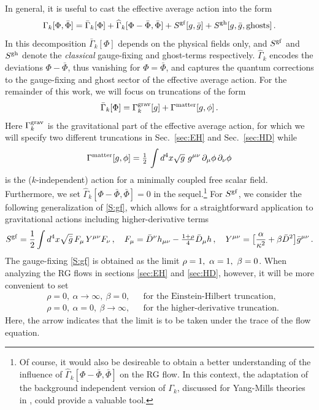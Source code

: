 \documentclass[preprint,preprintnumbers,amsmath,amssymb,nofootinbib,APS]{revtex4}
\newcommand{\be}{\begin{equation}}
\newcommand{\ee}{\end{equation}}
\newcommand{\bea}{\begin{eqnarray}}
\newcommand{\eea}{\end{eqnarray}}
\newcommand{\2}{\sqrt{2\,}}
\newcommand{\half}{\tfrac{1}{2}}
\newcommand{\gb}{\bar{g}}
\newcommand{\p}{\partial}
\newcommand{\Db}{\bar{D}}
\begin{document}
In general, it is useful to cast the effective average action into the form \cite{Reuter:1996cp}
%
\be
\Gamma_k[\Phi, \bar{\Phi}] = \bar{\Gamma}_k[\Phi] + \widehat{\Gamma}_k[\Phi - \bar{\Phi}, \bar{\Phi}] + 
S^{\rm gf}[g, \gb] + S^{\rm gh}[g, \gb, {\rm ghosts}] \, .
\ee
%
 In this decomposition $\bar{\Gamma}_k[\Phi]$ depends on the physical fields only, and $S^{\rm gf}$ and $S^{\rm gh}$ denote the {\it classical} gauge-fixing and ghost-terms respectively. $\widehat{\Gamma}_k$ encodes the deviations
$\Phi - \bar{\Phi}$, thus vanishing for $\Phi = \bar{\Phi}$, and captures the quantum corrections to the gauge-fixing and ghost sector of the effective average action.
For the remainder of this work, we will focus on truncations of the form
%
\be\label{EAA}
\bar{\Gamma}_k[\Phi] = \Gamma_k^{\rm grav}[g] + \Gamma^{\rm matter}[g, \phi] \, .
\ee
%
Here $\Gamma_k^{\rm grav}$ is the gravitational part of the effective average action, for which we will specify two different truncations in Sec.~\ref{sec:EH} and Sec.~\ref{sec:HD} while
%
\be\label{matter}
\Gamma^{\rm matter}[g, \phi] = \half \, \int d^4x \sqrt{g} \,  \, g^{\mu\nu} \, \p_\mu \phi \, \p_\nu \phi
\ee
%
is the ($k$-independent) action for a minimally coupled free scalar field. Furthermore, we set $\widehat{\Gamma}_k[\Phi-\bar{\Phi}, \bar{\Phi}] = 0$ in the sequel.\footnote{Of course, it would also be desireable to obtain a better understanding of the influence of $\widehat{\Gamma}_k[\Phi-\bar{\Phi}, \bar{\Phi}]$ on the RG flow. 
 In this context, the adaptation of the background independent version of $\Gamma_k$, discussed for Yang-Mills theories in \cite{Litim:2002ce}, could provide a valuable tool.} For $S^{\rm gf}$, we consider the following generalization of \eqref{S:gf}, 
which allows for a straightforward application to gravitational actions including higher-derivative terms
%
\be\label{S:gf2}
S^{\rm gf} = \frac{1}{2} \int d^4 x \sqrt{\gb} \, F_\mu \, Y^{\mu\nu} F_\nu \, , \quad
F_\mu = \Db^\nu h_{\mu \nu} - \tfrac{1+\rho}{4} \Db_\mu h \, , \quad Y^{\mu \nu} = \big[ \frac{\alpha}{\kappa^2} + \beta \Db^2 \big] \gb^{\mu \nu} \, .
\ee
%
The gauge-fixing \eqref{S:gf} is obtained as the limit $\rho = 1,\ \alpha = 1,\ \b=0$. When  analyzing the RG flows in sections \ref{sec:EH} and \ref{sec:HD}, however, it will be more convenient to set 
%
\bea
& \rho = 0,\ \alpha \rightarrow \infty,\ \beta = 0, \ & \,\,\, \text{for the Einstein-Hilbert truncation}, \label{gfEH} \\
& \rho = 0,\ \alpha = 0,\ \beta \rightarrow \infty, \ & \,\,\, \text{for the higher-derivative truncation}. \label{gfHD}
\eea
%
Here, the arrow indicates that the limit is to be taken under the trace of the flow equation.
\end{document}
